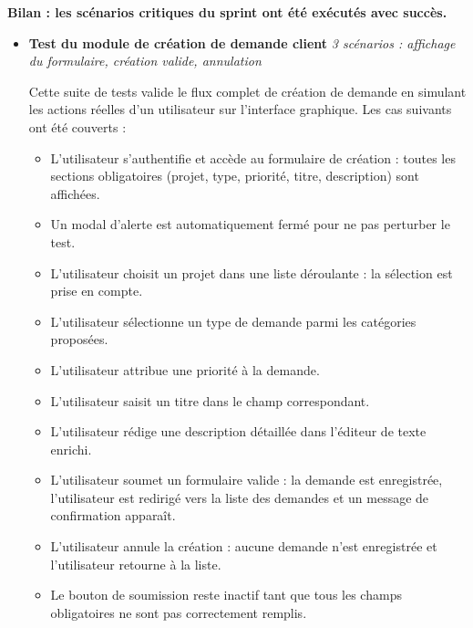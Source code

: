 \noindent\textbf{Bilan : les scénarios critiques du sprint ont été exécutés avec succès.}
\vspace{6pt}


\begin{itemize}[leftmargin=0pt]

\item[$\square$] \textbf{Test du module de création de demande client}
\newline \textit{3 scénarios : affichage du formulaire, création valide, annulation}

\noindent Cette suite de tests valide le flux complet de création de
demande en simulant les actions réelles d'un utilisateur sur
l'interface graphique. Les cas suivants ont été couverts :

\begin{itemize}[label=$\bullet$, nosep, itemsep=2pt]
  \item L'utilisateur s'authentifie et accède au formulaire de création : toutes les sections obligatoires (projet, type, priorité, titre, description) sont affichées.
  
  \item Un modal d'alerte est automatiquement fermé pour ne pas perturber le test.
  
  \item L'utilisateur choisit un projet dans une liste déroulante : la sélection est prise en compte.
  
  \item L'utilisateur sélectionne un type de demande parmi les catégories proposées.
  
  \item L'utilisateur attribue une priorité à la demande.
  
  \item L'utilisateur saisit un titre dans le champ correspondant.
  
  \item L'utilisateur rédige une description détaillée dans l'éditeur de texte enrichi.
  
  \item L'utilisateur soumet un formulaire valide : la demande est enregistrée, l'utilisateur est redirigé vers la liste des demandes et un message de confirmation apparaît.
  
  \item L'utilisateur annule la création : aucune demande n'est enregistrée et l'utilisateur retourne à la liste.
  
  \item Le bouton de soumission reste inactif tant que tous les champs obligatoires ne sont pas correctement remplis.
\end{itemize}


\end{itemize}
